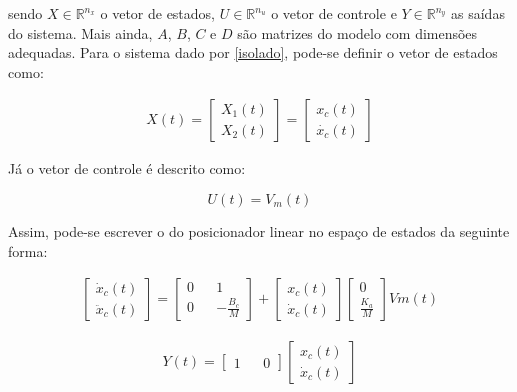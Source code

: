 \noindent sendo $X \in \mathbb{R}^{n_x}$ o vetor de estados, $U \in \mathbb{R}^{n_u}$ o vetor de controle e $Y \in \mathbb{R}^{n_y}$ as saídas do sistema. Mais ainda, $A$, $B$, $C$ e $D$ são matrizes do modelo com dimensões adequadas. Para o sistema dado por \eqref{isolado}, pode-se definir o vetor de estados como:

\begin{gather}
    X(t)= 
    \begin{bmatrix}
        X_1(t) \\ X_2(t) 
    \end{bmatrix}=
    \begin{bmatrix}
        x_c(t) \\ \dot{x_c}(t)
    \end{bmatrix}
    \label{vetor_estados}
\end{gather}

Já o vetor de controle é descrito como:

\begin{equation}
    U(t)=V_m(t)
    \label{vetor_controle}
\end{equation}

Assim, pode-se escrever o do posicionador linear no espaço de estados da seguinte forma:

\begin{gather}
    \begin{bmatrix}
        \dot{x}_c(t) \\ \ddot{x}_c(t)
    \end{bmatrix}=
    \begin{bmatrix}
        0 && 1 \\ 0 && -\frac{B_c}{M}
    \end{bmatrix}
    +
    \begin{bmatrix}
        x_c(t) \\ \dot{x}_c(t)
    \end{bmatrix}
    \begin{bmatrix}
        0 \\ \frac{K_a}{M}
    \end{bmatrix}
    Vm(t)
    \label{espaco_estados}
\end{gather}

\begin{gather}
    Y(t)=
    \begin{bmatrix}
        1 && 0
    \end{bmatrix}
    \begin{bmatrix}
        x_c(t) \\ \dot{x}_c(t)
    \end{bmatrix}
    \label{espaco_estados_saida}
\end{gather}

